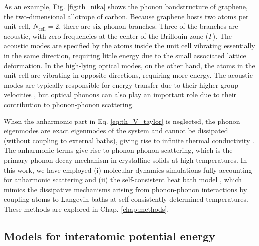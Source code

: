 As an example, Fig. \ref{fig:th_nika} shows the phonon bandstructure of graphene, the two-dimensional allotrope of carbon. Because graphene hosts two atoms per unit cell, $N_{\textrm{cell}}=2$, there are six phonon branches. Three of the branches are acoustic, with zero frequencies at the center of the Brillouin zone ($\Gamma$). The acoustic modes are specified by the atoms inside the unit cell vibrating essentially in the same direction, requiring little energy due to the small associated lattice deformation. In the high-lying optical modes, on the other hand, the atoms in the unit cell are vibrating in opposite directions, requiring more energy. The acoustic modes are typically responsible for energy transfer due to their higher group velocities \cite{ziman}, but optical phonons can also play an important role due to their contribution to phonon-phonon scattering. 


When the anharmonic part in Eq. \eqref{eq:th_V_taylor} is neglected, the phonon eigenmodes are exact eigenmodes of the system and cannot be dissipated (without coupling to external baths), giving rise to infinite thermal conductivity \cite{ziman}. The anharmonic terms give rise to phonon-phonon scattering, which is the primary phonon decay mechanism in crystalline solids at high temperatures. In this work, we have employed (i) molecular dynamics simulations fully accounting for anharmonic scattering and (ii) the self-consistent heat bath model \cite{bolsterli70}, which mimics the dissipative mechanisms arising from phonon-phonon interactions by coupling atoms to Langevin baths at self-consistently determined temperatures. These methods are explored in Chap. \ref{chap:methods}.

\fi





\subsection{Models for interatomic potential energy}
\label{sec:th_interatomicpotential}


